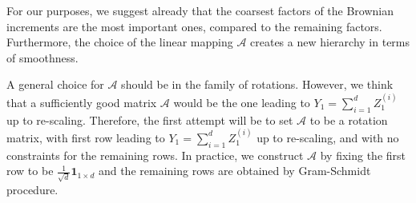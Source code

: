 \begin{remark}
For our purposes, we suggest already that the coarsest factors of the Brownian increments are the most important ones, compared to the remaining factors. Furthermore, the choice of the linear mapping $\mathcal{A}$ creates a new hierarchy in terms of smoothness.

\end{remark}

\begin{remark}
A general choice for $\mathcal{A}$ should be in the family of rotations. However, we think that a sufficiently good matrix $\mathcal{A}$ would be the one leading to $Y_1=\sum_{i=1}^d Z_1^{(i)}$ up to re-scaling. Therefore, the first attempt will be  to  set $\mathcal{A}$ to be a  rotation matrix, with first  row leading to $Y_1=\sum_{i=1}^d Z_1^{(i)}$ up to re-scaling, and with no constraints for the remaining rows. In practice, we construct $\mathcal{A}$ by fixing the first row to be $\frac{1}{\sqrt{d}} \mathbf{1}_{1 \times d}$ and the remaining rows are obtained by Gram-Schmidt procedure.
\end{remark}

